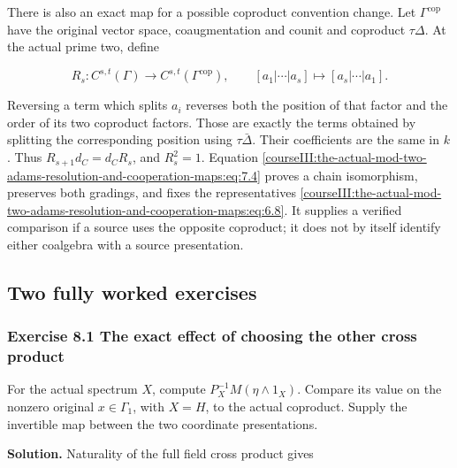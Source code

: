 There is also an exact map for a possible coproduct convention change. Let \(\Gamma^{\mathrm{cop}}\) have the original vector space, coaugmentation and counit and coproduct \(\tau\Delta\). At the actual prime two, define

\begin{equation}
R_s:C^{s,t}(\Gamma)\longrightarrow C^{s,t}(\Gamma^{\mathrm{cop}}),
 \qquad [a_1|\cdots|a_s]\longmapsto[a_s|\cdots|a_1].
 \label{courseIII:the-actual-mod-two-adams-resolution-and-cooperation-maps:eq:7.4}
\end{equation}

Reversing a term which splits \(a_i\) reverses both the position of that factor and the order of its two coproduct factors. Those are exactly the terms obtained by splitting the corresponding position using \(\tau\bar\Delta\). Their coefficients are the same in \(k\). Thus \(R_{s+1}d_C=d_CR_s\), and \(R_s^2=1\). Equation \eqref{courseIII:the-actual-mod-two-adams-resolution-and-cooperation-maps:eq:7.4} proves a chain isomorphism, preserves both gradings, and fixes the representatives \eqref{courseIII:the-actual-mod-two-adams-resolution-and-cooperation-maps:eq:6.8}. It supplies a verified comparison if a source uses the opposite coproduct; it does not by itself identify either coalgebra with a source presentation.

\subsection{Two fully worked exercises}
\label{courseIII:the-actual-mod-two-adams-resolution-and-cooperation-maps:cooperation-worked-exercises}

\label{courseIII:the-actual-mod-two-adams-resolution-and-cooperation-maps:section-8}

\subsubsection{Exercise 8.1 The exact effect of choosing the other cross product}
\label{courseIII:the-actual-mod-two-adams-resolution-and-cooperation-maps:exercise-8.1}

\label{courseIII:actual-resolution:8.1}

For the actual spectrum \(X\), compute \(P_X^{-1}M(\eta\wedge1_X)\). Compare its value on the nonzero original \(x\in\Gamma_1\), with \(X=H\), to the actual coproduct. Supply the invertible map between the two coordinate presentations.

\textbf{Solution.} Naturality of the full field cross product gives

